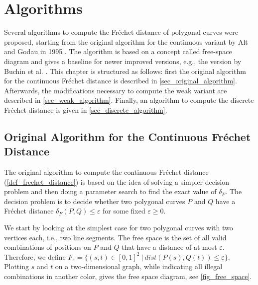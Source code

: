 \documentclass[
oneside,
fontsize=11pt
]{scrartcl}
\begin{document}
\section{Algorithms}
\label{sec_algorithms}
Several algorithms to compute the Fréchet distance of polygonal curves were proposed, 
starting from the original algorithm for the continuous variant by Alt and Godau in 1995 \cite{alt_computing_1995}.
The algorithm is based on a concept called free-space diagram and gives a baseline for newer improved versions, 
e.g., the version by Buchin et al. \cite{buchin_four_2017}. 
This chapter is structured as follows: 
first the original algorithm for the continuous Fréchet distance is described in \autoref{sec_original_algorithm}.
Afterwards, the modifications necessary to compute the weak variant are described in \autoref{sec_weak_algorithm}.
Finally, an algorithm to compute the discrete Fréchet distance is given in \autoref{sec_discrete_algorithm}.


\subsection{Original Algorithm for the Continuous Fréchet Distance}
\label{sec_original_algorithm}
The original algorithm to compute the continuous Fréchet distance (\autoref{def_frechet_distance})
is based on the idea of solving a simpler decision problem and then doing a parameter search to find the exact value of $\delta_{F}$.
The decision problem is to decide whether two polygonal curves $P$ and $Q$ have a 
Fréchet distance $\delta_{F}(P,Q) \leq \varepsilon$ for some fixed $\varepsilon \geq 0$.

We start by looking at the simplest case for two polygonal curves with two vertices each, i.e., two line segments.
The free space is the set of all valid combinations of positions on $P$ and $Q$ that have a distance of at most $\varepsilon$.
Therefore, we define $F_\varepsilon = \{(s,t) \in [0,1]^2 \ | \ dist(P(s), Q(t)) \leq \varepsilon \}$.
Plotting $s$ and $t$ on a two-dimensional graph, while indicating all illegal combinations in 
another color, gives the free space diagram, see \autoref{fig_free_space}. \cite{alt_computing_1995}
\end{document}
